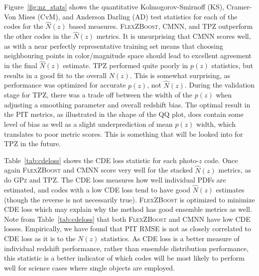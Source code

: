 Figure~\ref{fig:nz_stats} shows the quantitative Kolmogorov-Smirnoff (KS), Cramer-Von Mises (CvM), and Anderson Darling (AD) test statistics for each of the codes for the $\hat{N}(z)$ based measures.
\textsc{FlexZBoost}, \textsc{CMNN}, and \textsc{TPZ} outperform the other codes in the $\hat{N}(z)$ metrics.
It is unsurprising that \textsc{CMNN} scores well, as with a near perfectly representative training set means that choosing neighbouring points in color/magnitude space should lead to excellent agreement in the final $\hat{N}(z)$ estimate.  \textsc{TPZ} performed quite poorly in $p(z)$ statistics, but results in a good fit to the overall $N(z)$.  This is somewhat surprising, as performance was optimized for accurate $p(z)$, not $\hat{N}(z)$.  During the validation stage for \textsc{TPZ}, there was a trade off between the width of the $p(z)$ when adjusting a smoothing parameter and overall redshift bias.  The optimal result in the PIT metrics, as illustrated in the shape of the QQ plot, does contain some level of bias as well as a slight underprediction of mean $p(z)$ width, which translates to poor metric scores.  This is something that will be looked into for \textsc{TPZ} in the future.



Table~\ref{tab:cdeloss} shows the CDE loss statistic for each photo-$z$ code.  Once again \textsc{FlexZBoost} and \textsc{CMNN} score very well for the stacked $\hat{N}(z)$ metrics, as do \textsc{GPz} and \textsc{TPZ}.  The CDE loss measures how well individual PDFs are estimated, and codes with a low CDE loss tend to have good $\hat{N}(z)$ estimates (though the reverse is not necessarily true). \textsc{FlexZBoost} is optimized to minimize CDE loss which may explain why the method has good ensemble metrics as well. Note from Table~\ref{tab:cdeloss} that both \textsc{FlexZBoost} and \textsc{CMNN} have low CDE losses.  Empirically, we have found that PIT RMSE is not as closely correlated to CDE loss as it is to the $N(z)$ statistics.  As CDE loss is a better measure of individual redshift performance, rather than ensemble distribution performance, this statistic is a better indicator of which codes will be most likely to perform well for science cases where single objects are employed.

